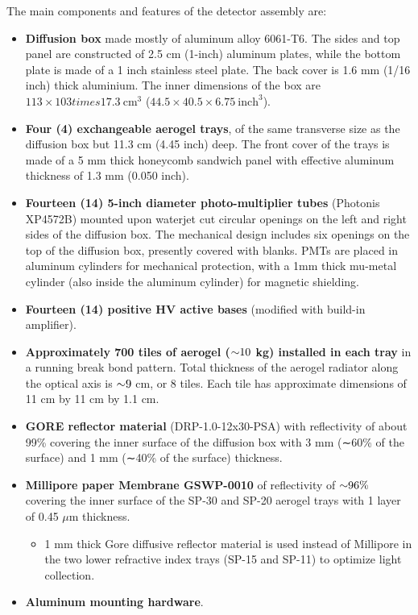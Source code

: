 The main components and features of the detector assembly are:
\begin{itemize}
  \item \textbf{Diffusion box} made mostly of aluminum alloy 6061-T6. The
    sides and top panel are constructed of 2.5 cm (1-inch) aluminum
    plates, while the bottom plate is made of a 1 inch stainless steel
    plate. The back cover is 1.6 mm (1/16 inch) thick aluminium. The
    inner dimensions of the box are $113\times 103
times 17.3~\textrm{cm}^3$ ($44.5\times 40.5\times 6.75~\textrm{inch}^3$).
  \item \textbf{Four (4) exchangeable aerogel trays}, of the same transverse
    size as the diffusion box but 11.3 cm (4.45 inch) deep. The front
    cover of the trays is made of a 5 mm thick honeycomb sandwich
    panel with effective aluminum thickness of 1.3 mm (0.050 inch).
  \item \textbf{Fourteen (14) 5-inch diameter photo-multiplier tubes}
    (Photonis XP4572B) mounted upon waterjet cut circular openings on
    the left and right sides of the diffusion box. The mechanical
    design includes six openings on the top of the diffusion box,
    presently covered with blanks. PMTs are placed in aluminum
    cylinders for mechanical protection, with a 1mm thick mu-metal
    cylinder (also inside the aluminum cylinder) for magnetic
    shielding.
  \item \textbf{Fourteen (14) positive HV active bases} (modified with
    build-in amplifier).
  \item \textbf{Approximately 700 tiles of aerogel ($\mathord{\sim} 10$ kg) installed in each
    tray} in a running break bond pattern. Total thickness of the
    aerogel radiator along the optical axis is $\mathord{\sim} 9$ cm, or 8 tiles. Each
    tile has approximate dimensions of 11 cm by 11 cm by 1.1 cm.
  \item \textbf{GORE reflector material} (DRP-1.0-12x30-PSA) with reflectivity
    of about 99\% covering the inner surface of the diffusion box with
    3 mm (∼60\% of the surface) and 1 mm (∼40\% of the surface)
    thickness.
  \item \textbf{Millipore paper Membrane GSWP-0010} of reflectivity of $\mathord{\sim} 96\%$
    covering the inner surface of the SP-30 and SP-20 aerogel trays
    with 1 layer of 0.45 $\mu$m thickness.
  \begin{itemize}
    \item 1 mm thick Gore diffusive reflector material is used instead
      of Millipore in the two lower refractive index trays (SP-15 and
      SP-11) to optimize light collection.
  \end{itemize}
  \item \textbf{Aluminum mounting hardware}.
\end{itemize}
